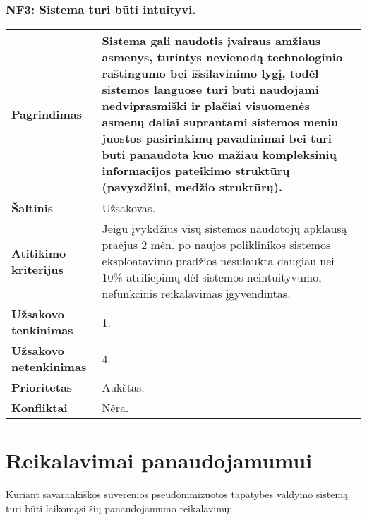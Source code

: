 \documentclass[12pt]{article}
\begin{document}
\subsubsection*{NF3: Sistema turi būti intuityvi.}
\label{sec:NF3}
\begin{table}[htb!]
    \captionsetup{justification=centering}
    \begin{tabular}{|m{4.9cm}|m{11cm}|}
        \hline
        \raggedleft \textbf{\cellcolor{orange!30}Pagrindimas} &
        Sistema gali naudotis įvairaus amžiaus asmenys, turintys nevienodą
        technologinio raštingumo bei išsilavinimo lygį, todėl sistemos languose
        turi būti naudojami nedviprasmiški ir plačiai visuomenės asmenų daliai
        suprantami sistemos meniu juostos pasirinkimų pavadinimai bei turi būti
        panaudota kuo mažiau kompleksinių informacijos pateikimo struktūrų
        (pavyzdžiui, medžio struktūrų). \\
        \hline
        \raggedleft \textbf{\cellcolor{orange!30}Šaltinis} & Užsakovas. \\
        \hline
        \raggedleft \textbf{\cellcolor{orange!30}Atitikimo kriterijus} & 
        Jeigu įvykdžius visų sistemos naudotojų apklausą praėjus 2 mėn. po
        naujos poliklinikos sistemos eksploatavimo pradžios nesulaukta daugiau
        nei 10\% atsiliepimų dėl sistemos neintuityvumo, nefunkcinis
        reikalavimas įgyvendintas. \\
        \hline
        \raggedleft \textbf{\cellcolor{orange!30}Užsakovo tenkinimas} & 1. \\
        \hline
        \raggedleft \textbf{\cellcolor{orange!30}Užsakovo netenkinimas} & 4. \\
        \hline
        \raggedleft \textbf{\cellcolor{orange!30}Prioritetas} & Aukštas. \\
        \hline
        \raggedleft \textbf{\cellcolor{orange!30}Konfliktai} & Nėra. \\
        \hline
    \end{tabular}
\end{table}

\section{Reikalavimai panaudojamumui}
Kuriant savarankiškos suverenios pseudonimizuotos tapatybės valdymo sistemą
turi būti laikomąsi šių panaudojamumo reikalavimų:
\end{document}
